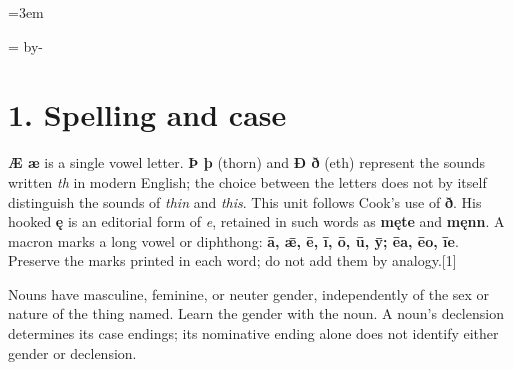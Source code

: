 \BookRecto
\begingroup
\renewcommand{\runningtitle}{Unit 1. Nouns, the article, and the copula}
\emergencystretch=3em
\newcommand{\reserve}[1]{\par\penalty-100\begingroup\dimen0=\pagegoal\advance\dimen0 by-\pagetotal\ifdim\dimen0<#1\newpage\fi\endgroup}
\newcommand{\itempara}[2]{\par\addvspace{3pt}\begingroup\raggedright\noindent\hangindent=1.8em\hangafter=1\makebox[1.8em][l]{#1.}#2\par\endgroup}

\raggedright
{}

\reserve{4\baselineskip}
\section*{1. Spelling and case}

\textbf{Æ æ} is a single vowel letter. \textbf{Þ þ} (thorn) and \textbf{Ð ð} (eth) represent the sounds written \emph{th} in modern English; the choice between the letters does not by itself distinguish the sounds of \emph{thin} and \emph{this}. This unit follows Cook's use of \textbf{ð}. His hooked \textbf{ę} is an editorial form of \emph{e}, retained in such words as \textbf{męte} and \textbf{męnn}. A macron marks a long vowel or diphthong: \textbf{ā, ǣ, ē, ī, ō, ū, ȳ; ēa, ēo, īe}. Preserve the marks printed in each word; do not add them by analogy.[1]

Nouns have masculine, feminine, or neuter gender, independently of the sex or nature of the thing named. Learn the gender with the noun. A noun's declension determines its case endings; its nominative ending alone does not identify either gender or declension.

